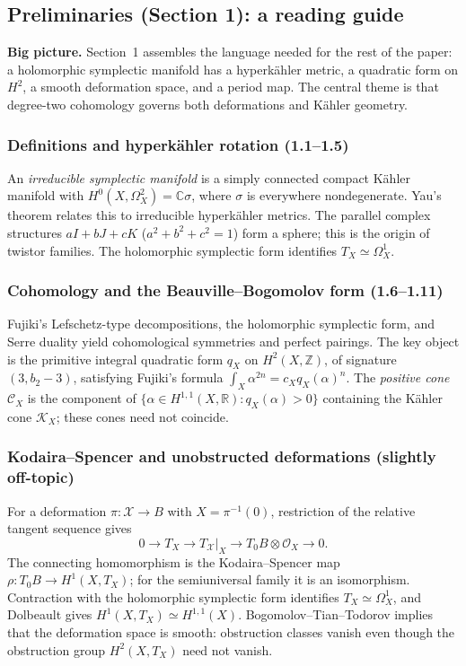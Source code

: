 \subsection{Preliminaries (Section 1): a reading guide}
\label{subsection-huybrechts-preliminaries}

\noindent
\textbf{Big picture.}
Section~1 assembles the language needed for the rest of
the paper: a holomorphic symplectic manifold has a
hyperk\"ahler metric, a quadratic form on $H^2$, a
smooth deformation space, and a period map.
The central theme is that degree-two cohomology
governs both deformations and K\"ahler geometry.

\subsubsection{Definitions and hyperk\"ahler rotation
(1.1--1.5)}
\label{subsubsection-hyperkahler-rotation}
An \emph{irreducible symplectic manifold} is a
simply connected compact K\"ahler manifold with
$H^0(X,\Omega_X^2)=\mathbb C\sigma$, where $\sigma$
is everywhere nondegenerate. Yau's theorem relates
this to irreducible hyperk\"ahler metrics.
The parallel complex structures
$aI+bJ+cK$ ($a^2+b^2+c^2=1$) form a
sphere; this is the origin of twistor families.
The holomorphic symplectic form identifies
$T_X\simeq\Omega_X^1$.

\subsubsection{Cohomology and the Beauville--Bogomolov
form (1.6--1.11)}
\label{subsubsection-beauville-bogomolov}
Fujiki's Lefschetz-type decompositions,
the holomorphic symplectic form, and
Serre duality yield cohomological symmetries
and perfect pairings. The key object is the
primitive integral quadratic form
$q_X$ on $H^2(X,\mathbb Z)$, of signature
$(3,b_2-3)$, satisfying Fujiki's formula
$\int_X\alpha^{2n}=c_Xq_X(\alpha)^n$.
The \emph{positive cone} $\mathcal C_X$ is
the component of
$\{\alpha\in H^{1,1}(X,\mathbb R):
q_X(\alpha)>0\}$ containing the K\"ahler
cone $\mathcal K_X$; these cones need
not coincide.

\subsubsection{Kodaira--Spencer and unobstructed deformations (slightly off-topic)}
\label{subsubsection-kodaira-spencer}
For a deformation $\pi:\mathcal X\to B$ with
$X=\pi^{-1}(0)$, restriction of the relative
tangent sequence gives
\[
0\to T_X\to T_{\mathcal X}|_X
\to T_0B\otimes\mathcal O_X\to0.
\]
The connecting homomorphism is the
Kodaira--Spencer map
$\rho:T_0B\to H^1(X,T_X)$; for the
semiuniversal family it is an isomorphism.
Contraction with the holomorphic symplectic
form identifies $T_X\simeq\Omega_X^1$,
and Dolbeault gives
$H^1(X,T_X)\simeq H^{1,1}(X)$.
Bogomolov--Tian--Todorov implies that
the deformation space is smooth: obstruction
classes vanish even though the obstruction
group $H^2(X,T_X)$ need not vanish.

